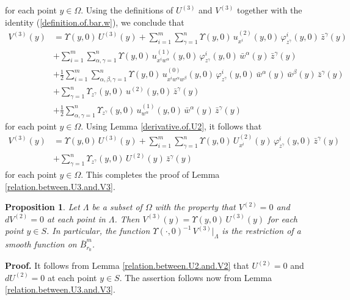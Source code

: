 \documentclass[11pt]{amsart}
\newtheorem{proposition}[theorem]{Proposition}
\theoremstyle{definition}
\begin{document}
for each point $y \in \Omega$. Using the definitions of $U^{(3)}$ and $V^{(3)}$ together with the identity (\ref{definition.of.bar.w}), we conclude that 
\begin{align*} 
V^{(3)}(y) 
&= \Upsilon(y,0) \, U^{(3)}(y) + \sum_{i=1}^m \sum_{\gamma=1}^n \Upsilon(y,0) \, u^{(2)}_{x^i}(y,0) \, \varphi^i_{z^\gamma}(y,0) \, \bar{z}^\gamma(y) \\ 
&+ \sum_{i=1}^m \sum_{\alpha,\gamma=1}^n \Upsilon(y,0) \, u^{(1)}_{x^i w^\alpha}(y,0) \, \varphi^i_{z^\gamma}(y,0) \, \bar{w}^\alpha(y) \, \bar{z}^\gamma(y) \\ 
&+ \frac{1}{2} \sum_{i=1}^m \sum_{\alpha,\beta,\gamma=1}^n \Upsilon(y,0) \, u^{(0)}_{x^i w^\alpha w^\beta}(y,0) \, \varphi^i_{z^\gamma}(y,0) \, \bar{w}^\alpha(y) \, \bar{w}^\beta(y) \, \bar{z}^\gamma(y) \\ 
&+ \sum_{\gamma=1}^n \Upsilon_{z^\gamma}(y,0) \, u^{(2)}(y,0)  \, \bar{z}^\gamma(y) \\ 
&+ \frac{1}{2} \sum_{\alpha,\gamma=1}^n \Upsilon_{z^\gamma}(y,0) \, u^{(1)}_{w^\alpha}(y,0) \, \bar{w}^\alpha(y) \, \bar{z}^\gamma(y)
\end{align*} 
for each point $y \in \Omega$. Using Lemma \ref{derivative.of.U2}, it follows that 
\begin{align*} 
V^{(3)}(y) 
&= \Upsilon(y,0) \, U^{(3)}(y) + \sum_{i=1}^m \sum_{\gamma=1}^n \Upsilon(y,0) \, U^{(2)}_{x^i}(y) \, \varphi^i_{z^\gamma}(y,0) \, \bar{z}^\gamma(y) \\ 
&+ \sum_{\gamma=1}^n \Upsilon_{z^\gamma}(y,0) \, U^{(2)}(y)  \, \bar{z}^\gamma(y) 
\end{align*}
for each point $y \in \Omega$. This completes the proof of Lemma \ref{relation.between.U3.and.V3}. \\


\begin{proposition} 
\label{invariance}
Let $\Lambda$ be a subset of $\Omega$ with the property that $V^{(2)} = 0$ and $dV^{(2)} = 0$ at each point in $\Lambda$. Then $V^{(3)}(y) = \Upsilon(y,0) \, U^{(3)}(y)$ for each point $y \in S$. In particular, the function $\Upsilon(\cdot,0)^{-1} \, V^{(3)}|_\Lambda$ is the restriction of a smooth function on $\bar{B}_{r_0}^m$.
\end{proposition}

\textbf{Proof.} 
It follows from Lemma \ref{relation.between.U2.and.V2} that $U^{(2)} = 0$ and $dU^{(2)} = 0$ at each point $y \in S$. The assertion follows now from Lemma \ref{relation.between.U3.and.V3}. \\
\end{document}
